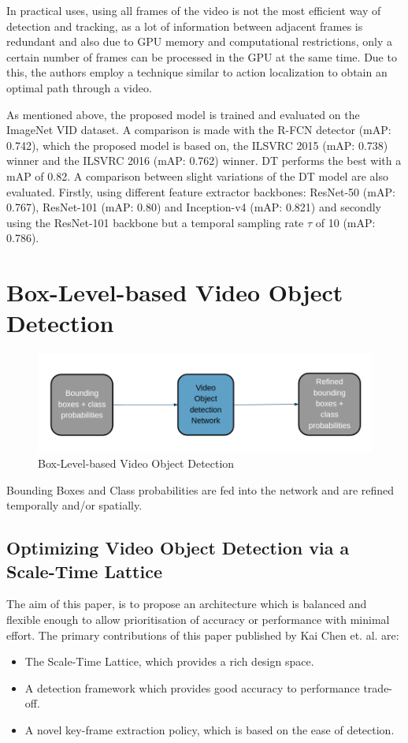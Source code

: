 \documentclass[conference]{IEEEtran}
\begin{document}
In practical uses, using all frames of the video is not the most efficient way of detection and tracking, as a lot of information between adjacent frames is redundant and also due to GPU memory and computational restrictions, only a certain number of frames can be processed in the GPU at the same time. Due to this, the authors employ a technique similar to action localization\cite{b41} to obtain an optimal path through a video. \newline

As mentioned above, the proposed model is trained and evaluated on the ImageNet VID dataset. A comparison is made with the R-FCN detector (mAP: 0.742), which the proposed model is based on, the ILSVRC 2015\cite{b42} (mAP: 0.738) winner and the ILSVRC 2016\cite{b43} (mAP: 0.762) winner. DT performs the best with a mAP of 0.82. A comparison between slight variations of the DT model are also evaluated. Firstly, using different feature extractor backbones: ResNet-50 (mAP: 0.767), ResNet-101 (mAP: 0.80) and Inception-v4 (mAP: 0.821)\cite{b44} and secondly using the ResNet-101 backbone but a temporal sampling rate $\tau$ of 10 (mAP: 0.786).

\section{Box-Level-based Video Object Detection}

\begin{figure}[h]
\includegraphics[width=\columnwidth]{box-level-basic}
\caption{Box-Level-based Video Object Detection}
\end{figure}
Bounding Boxes and Class probabilities are fed into the network and are refined temporally and/or spatially.

\subsection{Optimizing Video Object Detection via a Scale-Time Lattice\cite{b10}}

The aim of this paper, is to propose an architecture which is balanced and flexible enough to allow prioritisation of accuracy or performance with minimal effort. The primary contributions of this paper published by Kai Chen et. al. are:
\begin{itemize}
	\item The Scale-Time Lattice, which provides a rich design space.
	\item A detection framework which provides good accuracy to performance trade-off.
	\item A novel key-frame extraction policy, which is based on the ease of detection.
\end{itemize}
\end{document}
